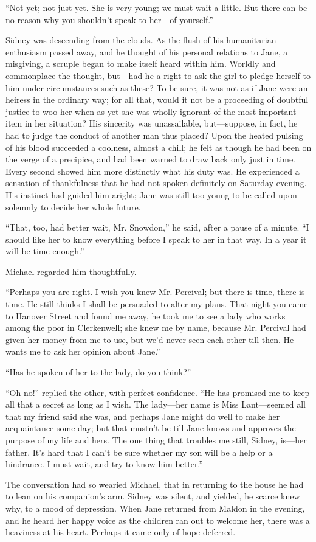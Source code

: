 {}``Not yet; not just yet. She is very young; we must wait a little. But
there can be no reason why you shouldn't speak to her---of yourself.''

Sidney was descending from the clouds. As the flush of his humanitarian
enthusiasm passed away, and he thought of his personal relations to
Jane, a misgiving, a scruple began to make itself heard within him.
Worldly and commonplace the thought, but---had he a right to ask the
girl to pledge herself to him under circumstances such as these? To be
sure, it was not as if Jane were an heiress in the ordinary way; for all
that, would it not be a proceeding of doubtful justice to woo her when
as yet she was wholly ignorant of the most important item in her
situation? His sincerity was unassailable, but---suppose, in fact, he
had to judge the conduct of another man thus placed? Upon the heated
pulsing of his blood succeeded a coolness, almost a chill; he felt as
though he had been on the verge of a precipice, and had been warned to
draw back {}only just in time. Every second showed him more distinctly
what his duty was. He experienced a sensation of thankfulness that he
had not spoken definitely on Saturday evening. His instinct had guided
him aright; Jane was still too young to be called upon solemnly to
decide her whole future.

``That, too, had better wait, Mr. Snowdon,'' he said, after a pause of a
minute. ``I should like her to know everything before I speak to her in
that way. In a year it will be time enough.''

Michael regarded him thoughtfully.

``Perhaps you are right. I wish you knew Mr. Percival; but there is
time, there is time. He still thinks I shall be persuaded to alter my
plans. That night you came to Hanover Street and found me away, he took
me to see a lady who works among the poor in Clerkenwell; she knew me by
name, because Mr. Percival had given her money from me to use, but we'd
never seen each other till then. He wants me to ask her opinion about
Jane.''

{}``Has he spoken of her to the lady, do you think?''

``Oh no!'' replied the other, with perfect confidence. ``He has promised
me to keep all that a secret as long as I wish. The lady---her name is
Miss Lant---seemed all that my friend said she was, and perhaps Jane
might do well to make her acquaintance some day; but that mustn't be
till Jane knows and approves the purpose of my life and hers. The one
thing that troubles me still, Sidney, is---her father. It's hard that I
can't be sure whether my son will be a help or a hindrance. I must wait,
and try to know him better.''

The conversation had so wearied Michael, that in returning to the house
he had to lean on his companion's arm. Sidney was silent, and yielded,
he scarce knew why, to a mood of depression. When Jane returned from
Maldon in the evening, and he heard her happy voice as the children ran
out to welcome her, there was a heaviness at his heart. Perhaps it came
only of hope deferred.
